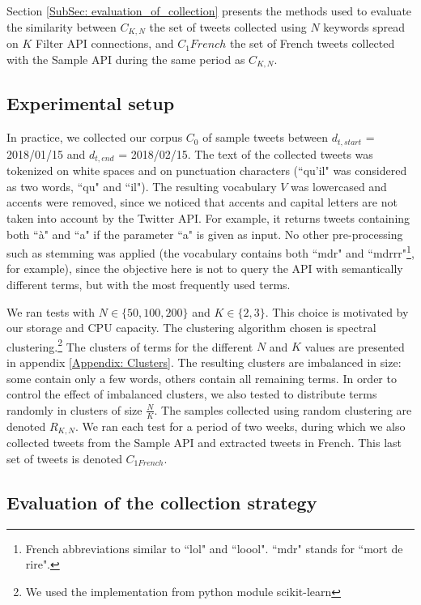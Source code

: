 Section \ref{SubSec: evaluation_of_collection} presents the methods used to evaluate the similarity between $C_{K,N}$ the set of tweets collected using $N$ keywords spread on $K$ Filter API connections, and $C_1 French$ the set of French tweets collected with the Sample API during the same period as $C_{K,N}$.

			\subsection{Experimental setup}

In practice, we collected our corpus $C_0$ of sample tweets between $d_{t,start} $ = 2018/01/15 and $d_{t,end}$ = 2018/02/15. The text of the collected tweets was tokenized on white spaces and on punctuation characters (``qu'il" was considered as two words, ``qu" and ``il"). The resulting vocabulary $V$ was lowercased and accents were removed, since we noticed that accents and capital letters are not taken into account by the Twitter API. For example, it returns tweets containing both ``à" and ``a" if the parameter ``a" is given as input. No other pre-processing such as stemming was applied (the vocabulary contains both ``mdr" and ``mdrrr"\footnote{French abbreviations similar to ``lol" and ``loool". ``mdr" stands for ``mort de rire".}, for example), since the objective here is not to query the API with semantically different terms, but with the most frequently used terms.


 We ran tests with $N \in \{50, 100, 200\}$ and $K \in \{2,3\}$. This choice is motivated by our storage and CPU capacity. The clustering algorithm chosen is spectral clustering.\footnote{We used the implementation from python module scikit-learn} The clusters of terms for the different $N$ and $K$ values are presented in appendix \ref{Appendix: Clusters}. The resulting clusters are imbalanced in size: some contain only a few words, others contain all remaining terms. In order to control the effect of imbalanced clusters, we also tested to distribute terms randomly in clusters of size $\frac{N}{K}$. The samples collected using random clustering are denoted $R_{K,N}$. We ran each test for a period of two weeks, during which we also collected tweets from the Sample API and extracted tweets in French. This last set of tweets is denoted $C_{1 French}$.
			
			\subsection{Evaluation of the collection strategy \label{SubSec: evaluation_of_collection}}
			
